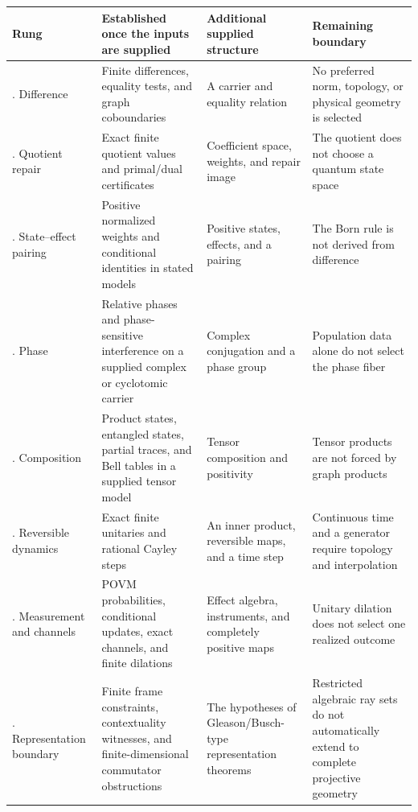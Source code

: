 \documentclass[
  11pt,
]{article}
\begin{document}
\begin{longtable}[]{@{}
  >{\raggedright\arraybackslash}p{}
  >{\raggedright\arraybackslash}p{}
  >{\raggedright\arraybackslash}p{}
  >{\raggedright\arraybackslash}p{}@{}}
\toprule\noalign{}
\begin{minipage}[b]{\linewidth}\raggedright
Rung
\end{minipage} & \begin{minipage}[b]{\linewidth}\raggedright
Established once the inputs are supplied
\end{minipage} & \begin{minipage}[b]{\linewidth}\raggedright
Additional supplied structure
\end{minipage} & \begin{minipage}[b]{\linewidth}\raggedright
Remaining boundary
\end{minipage} \\
\midrule\noalign{}
\endhead
\bottomrule\noalign{}
\endlastfoot
1. Difference & Finite differences, equality tests, and graph
coboundaries & A carrier and equality relation & No preferred norm,
topology, or physical geometry is selected \\
2. Quotient repair & Exact finite quotient values and
primal\allowbreak{}/\allowbreak{}dual certificates & Coefficient space,
weights, and repair image & The quotient does not choose a quantum state
space \\
3. State--effect pairing & Positive normalized weights and conditional
identities in stated models & Positive states, effects, and a pairing &
The Born rule is not derived from difference \\
4. Phase & Relative phases and phase-sensitive interference on a
supplied complex or cyclotomic carrier & Complex conjugation and a phase
group & Population data alone do not select the phase fiber \\
5. Composition & Product states, entangled states, partial traces, and
Bell tables in a supplied tensor model & Tensor composition and
positivity & Tensor products are not forced by graph products \\
6. Reversible dynamics & Exact finite unitaries and rational Cayley
steps & An inner product, reversible maps, and a time step & Continuous
time and a generator require topology and interpolation \\
7. Measurement and channels & POVM probabilities, conditional updates,
exact channels, and finite dilations & Effect algebra, instruments, and
completely positive maps & Unitary dilation does not select one realized
outcome \\
8. Representation boundary & Finite frame constraints, contextuality
witnesses, and finite-dimensional commutator obstructions & The
hypotheses of Gleason\allowbreak{}/\allowbreak{}Busch-type
representation theorems & Restricted algebraic ray sets do not
automatically extend to complete projective geometry \\
\end{longtable}
\end{document}
